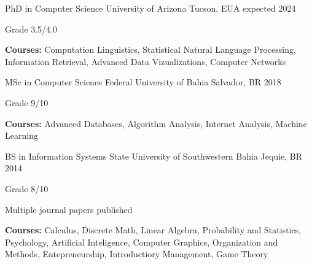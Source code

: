 

\begin{cventries}


  \cventry
    {PhD in Computer Science} %
    {University of Arizona} %
    {Tucson, EUA} %
    {expected 2024} %
    {
      \begin{cvitems} %
        \item {Grade 3.5/4.0}
        \item {\textbf{Courses:} } Computation Linguistics, Statistical Natural Language Processing, Information Retrieval, Advanced Data Vizualizations, Computer Networks
      \end{cvitems}
    }

  \cventry
    {MSc in Computer Science} %
    {Federal University of Bahia} %
    {Salvador, BR} %
    {2018} %
    {
      \begin{cvitems} %
        \item {Grade 9/10}
        \item {\textbf{Courses:} } Advanced Databases, Algorithm Analysis, Internet Analysis, Machine Learning
      \end{cvitems}
    }
    
  \cventry
    {BS in Information Systems} %
    {State University of Southwestern Bahia} %
    {Jequie, BR} %
    {2014} %
    {
      \begin{cvitems} %
        \item {Grade 8/10}
        \item {Multiple journal papers published}
        \item {\textbf{Courses:} } Calculus, Discrete Math, Linear Algebra, Probability and Statistics, Psychology, Artificial Inteligence, Computer Graphics, Organization and Methods, Entepreneurship, Introductiory Management, Game Theory
      \end{cvitems}
    }
    
\end{cventries}
